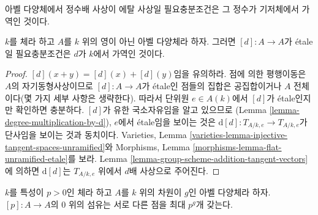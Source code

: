 \begin{lemma}
\label{lemma-abelian-variety-multiplication-by-d-etale}
\begin{slogan}
아벨 다양체에서 정수배 사상이 에탈 사상일 필요충분조건은 그 정수가 기저체에서 가역인 것이다.
\end{slogan}
$k$를 체라 하고 $A$를 $k$ 위의 영이 아닌 아벨 다양체라 하자. 그러면 $[d] : A \to A$가 \'etale일
필요충분조건은 $d$가 $k$에서 가역인 것이다.
\end{lemma}

\begin{proof}
$[d](x + y) = [d](x) + [d](y)$임을 유의하라. 점에 의한 평행이동은 $A$의 자기동형사상이므로
$[d] : A \to A$가 \'etale인 점들의 집합은 공집합이거나 $A$ 전체이다(몇 가지 세부 사항은 생략한다).
따라서 단위원 $e \in A(k)$에서 $[d]$가 \'etale인지만 확인하면 충분하다. $[d]$가 유한 국소자유임을 알고 있으므로
(Lemma \ref{lemma-degree-multiplication-by-d}), $e$에서 \'etale임을 보이는 것은
$\text{d}[d] : T_{A/k, e} \to T_{A/k, e}$가 단사임을 보이는 것과 동치이다. Varieties, Lemma
\ref{varieties-lemma-injective-tangent-spaces-unramified}와 Morphisms, Lemma
\ref{morphisms-lemma-flat-unramified-etale}를 보라. Lemma \ref{lemma-group-scheme-addition-tangent-vectors}에 의하면
$\text{d}[d]$는 $T_{A/k, e}$ 위에서 $d$배 사상으로 주어진다.
\end{proof}

\begin{lemma}
\label{lemma-abelian-variety-multiplication-by-p}
$k$를 특성이 $p > 0$인 체라 하고 $A$를 $k$ 위의 차원이 $g$인 아벨 다양체라 하자.
$[p] : A \to A$의 $0$ 위의 섬유는 서로 다른 점을 최대 $p^g$개 갖는다.
\end{lemma}

